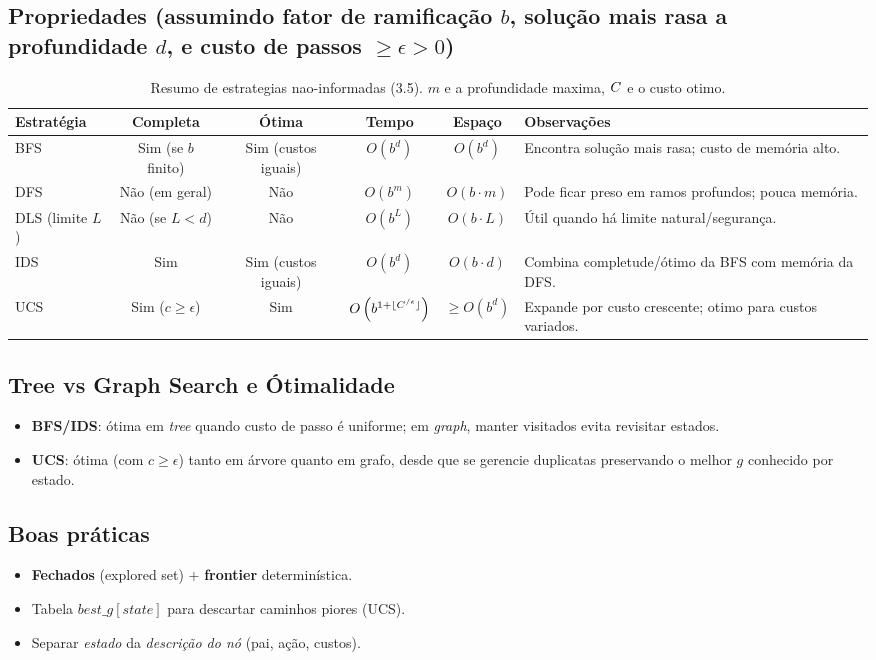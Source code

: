 \documentclass[9pt,a4paper]{extarticle}
\begin{document}
\subsection*{Propriedades (assumindo fator de ramificação $b$, solução mais rasa a profundidade $d$, e custo de passos $\ge \epsilon > 0$)}
\begin{table}[h]
\centering
\small
\setlength{\tabcolsep}{4pt}
\renewcommand{\arraystretch}{1.2}
\begin{tabular}{@{}lccccp{6cm}@{}}
\toprule
\textbf{Estratégia} & \textbf{Completa} & \textbf{Ótima} & \textbf{Tempo} & \textbf{Espaço} & \textbf{Observações} \\
\midrule
BFS & Sim (se $b$ finito) & Sim (custos iguais) & $O(b^{d})$ & $O(b^{d})$ & Encontra solução mais rasa; custo de memória alto. \\
DFS & Não (em geral) & Não & $O(b^{m})$ & $O(b\cdot m)$ & Pode ficar preso em ramos profundos; pouca memória. \\
DLS (limite $L$) & Não (se $L<d$) & Não & $O(b^{L})$ & $O(b\cdot L)$ & Útil quando há limite natural/segurança. \\
IDS & Sim & Sim (custos iguais) & $O(b^{d})$ & $O(b\cdot d)$ & Combina completude/ótimo da BFS com memória da DFS. \\
UCS & Sim ($c\ge\epsilon$) & Sim & $ O \left ( b^{ 1 + \lfloor C^{\*/\epsilon} \rfloor } \right ) $ & $\ge O(b^{d})$ & Expande por custo crescente; otimo para custos variados. \\
\bottomrule
\end{tabular}
\caption{Resumo de estrategias nao-informadas (3.5). $m$ e a profundidade maxima, $C^{\*}$ e o custo otimo.}
\end{table}

\subsection*{Tree vs Graph Search e Ótimalidade}
\begin{itemize}
  \item \textbf{BFS/IDS}: ótima em \textit{tree} quando custo de passo é uniforme; em \textit{graph}, manter visitados evita revisitar estados.
  \item \textbf{UCS}: ótima (com $c\ge \epsilon$) tanto em árvore quanto em grafo, desde que se gerencie duplicatas preservando o melhor $g$ conhecido por estado.
\end{itemize}

\subsection*{Boas práticas}
\begin{itemize}
  \item \textbf{Fechados} (explored set) + \textbf{frontier} determinística.
  \item Tabela $best\_g[state]$ para descartar caminhos piores (UCS).
  \item Separar \textit{estado} da \textit{descrição do nó} (pai, ação, custos).
\end{itemize}
\end{document}
